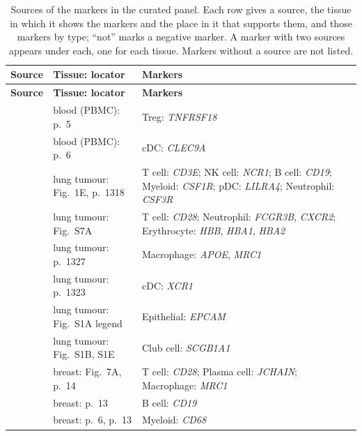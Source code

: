 \begin{longtable}{@{}>{\raggedright\arraybackslash}p{2.0cm} >{\raggedright\arraybackslash}p{4.6cm} >{\raggedright\arraybackslash}p{8.4cm}@{}}
\caption{Sources of the markers in the curated panel. Each row gives a source, the tissue in which it shows the markers and the place in it that supports them, and those markers by type; ``not'' marks a negative marker. A marker with two sources appears under each, one for each tissue. Markers without a source are not listed.}\label{tab:panel-sources}\\
\toprule
\textbf{Source} & \textbf{Tissue: locator} & \textbf{Markers} \\
\midrule
\endfirsthead
\toprule
\textbf{Source} & \textbf{Tissue: locator} & \textbf{Markers} \\
\midrule
\endhead
\bottomrule
\endfoot
\cite{zhengMassivelyParallelDigital2017} & blood (PBMC): p.~5 & Treg: \textit{TNFRSF18} \\
\cite{zhengMassivelyParallelDigital2017} & blood (PBMC): p.~6 & cDC: \textit{CLEC9A} \\
\cite{zilionisSingleCellTranscriptomicsHuman2019} & lung tumour: Fig.~1E, p.~1318 & T cell: \textit{CD3E}; NK cell: \textit{NCR1}; B cell: \textit{CD19}; Myeloid: \textit{CSF1R}; pDC: \textit{LILRA4}; Neutrophil: \textit{CSF3R} \\
\cite{zilionisSingleCellTranscriptomicsHuman2019} & lung tumour: Fig.~S7A & T cell: \textit{CD28}; Neutrophil: \textit{FCGR3B}, \textit{CXCR2}; Erythrocyte: \textit{HBB}, \textit{HBA1}, \textit{HBA2} \\
\cite{zilionisSingleCellTranscriptomicsHuman2019} & lung tumour: p.~1327 & Macrophage: \textit{APOE}, \textit{MRC1} \\
\cite{zilionisSingleCellTranscriptomicsHuman2019} & lung tumour: p.~1323 & cDC: \textit{XCR1} \\
\cite{zilionisSingleCellTranscriptomicsHuman2019} & lung tumour: Fig.~S1A legend & Epithelial: \textit{EPCAM} \\
\cite{zilionisSingleCellTranscriptomicsHuman2019} & lung tumour: Fig.~S1B, S1E & Club cell: \textit{SCGB1A1} \\
\cite{palSinglecellRNAExpression2021} & breast: Fig.~7A, p.~14 & T cell: \textit{CD28}; Plasma cell: \textit{JCHAIN}; Macrophage: \textit{MRC1} \\
\cite{palSinglecellRNAExpression2021} & breast: p.~13 & B cell: \textit{CD19} \\
\cite{palSinglecellRNAExpression2021} & breast: p.~6, p.~13 & Myeloid: \textit{CD68} \\

\end{longtable}
